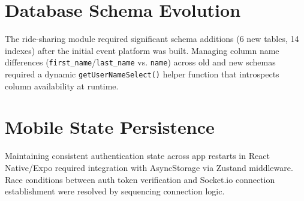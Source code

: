 \section{Database Schema Evolution}
The ride-sharing module required significant schema additions (6 new tables, 14 indexes) after the initial event platform was built. Managing column name differences (\texttt{first\_name}/\texttt{last\_name} vs. \texttt{name}) across old and new schemas required a dynamic \texttt{getUserNameSelect()} helper function that introspects column availability at runtime.

\section{Mobile State Persistence}
Maintaining consistent authentication state across app restarts in React Native/Expo required integration with AsyncStorage via Zustand middleware. Race conditions between auth token verification and Socket.io connection establishment were resolved by sequencing connection logic.